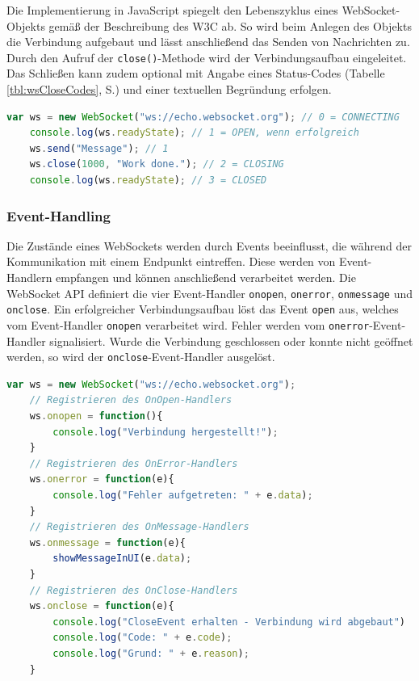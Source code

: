 \documentclass[11pt,a4paper,titlepage]{scrartcl}
\numberwithin{equation}{section}
\begin{document}
\noindent Die Implementierung in JavaScript spiegelt den Lebenszyklus eines WebSocket-Objekts gemäß der Beschreibung des W3C ab. So wird beim Anlegen des Objekts die Verbindung aufgebaut und lässt anschließend das Senden von Nachrichten zu. Durch den Aufruf der \texttt{close()}-Methode wird der Verbindungsaufbau eingeleitet. Das Schließen kann zudem optional mit Angabe eines Status-Codes (Tabelle \ref{tbl:wsCloseCodes}, S.\pageref{tbl:wsCloseCodes}) und einer textuellen Begründung erfolgen.\\

\begin{lstlisting}[frame=single, language=JavaScript, caption=WebSocket Lebenszyklus]
	var ws = new WebSocket("ws://echo.websocket.org"); // 0 = CONNECTING
	console.log(ws.readyState); // 1 = OPEN, wenn erfolgreich
	ws.send("Message"); // 1
	ws.close(1000, "Work done."); // 2 = CLOSING
	console.log(ws.readyState); // 3 = CLOSED
\end{lstlisting}

\subsubsection{Event-Handling}
Die Zustände eines WebSockets werden durch Events beeinflusst, die während der Kommunikation mit einem Endpunkt eintreffen. Diese werden von Event-Handlern empfangen und können anschließend verarbeitet werden. Die WebSocket API definiert die vier Event-Handler \texttt{onopen}, \texttt{onerror}, \texttt{onmessage} und \texttt{onclose}. Ein erfolgreicher Verbindungsaufbau löst das Event \texttt{open} aus, welches vom Event-Handler \texttt{onopen} verarbeitet wird. Fehler werden vom \texttt{onerror}-Event-Handler signalisiert. Wurde die Verbindung geschlossen oder konnte nicht geöffnet werden, so wird der \texttt{onclose}-Event-Handler ausgelöst. \\

\begin{lstlisting}[frame=single, language=JavaScript, caption=WebSocket Event-Handler]
	var ws = new WebSocket("ws://echo.websocket.org");
	// Registrieren des OnOpen-Handlers
	ws.onopen = function(){
		console.log("Verbindung hergestellt!");
	}
	// Registrieren des OnError-Handlers
	ws.onerror = function(e){
		console.log("Fehler aufgetreten: " + e.data);
	}	
	// Registrieren des OnMessage-Handlers
	ws.onmessage = function(e){
		showMessageInUI(e.data);
	}
	// Registrieren des OnClose-Handlers
	ws.onclose = function(e){
		console.log("CloseEvent erhalten - Verbindung wird abgebaut")
		console.log("Code: " + e.code);
		console.log("Grund: " + e.reason);
	}
\end{lstlisting} \vspace{-4mm}
\end{document}
